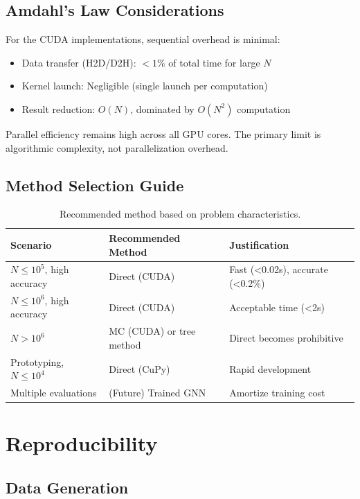 \documentclass[11pt,a4paper]{article}
\begin{document}
\subsection{Amdahl's Law Considerations}

For the CUDA implementations, sequential overhead is minimal:
\begin{itemize}
\item Data transfer (H2D/D2H): $<1\%$ of total time for large $N$
\item Kernel launch: Negligible (single launch per computation)
\item Result reduction: $O(N)$, dominated by $O(N^2)$ computation
\end{itemize}

Parallel efficiency remains high across all GPU cores. The primary limit is algorithmic complexity, not parallelization overhead.

\subsection{Method Selection Guide}

\begin{table}[H]
  \centering
  \caption{Recommended method based on problem characteristics.}
  \label{table:method_selection}
  \begin{tabular}{lll}
    \toprule
    Scenario & Recommended Method & Justification \\
    \midrule
    $N \leq 10^5$, high accuracy & Direct (CUDA) & Fast (<0.02s), accurate (<0.2\%) \\
    $N \leq 10^6$, high accuracy & Direct (CUDA) & Acceptable time (<2s) \\
    $N > 10^6$ & MC (CUDA) or tree method & Direct becomes prohibitive \\
    Prototyping, $N \leq 10^4$ & Direct (CuPy) & Rapid development \\
    Multiple evaluations & (Future) Trained GNN & Amortize training cost \\
    \bottomrule
  \end{tabular}
\end{table}

\section{Reproducibility}

\subsection{Data Generation}
\end{document}
